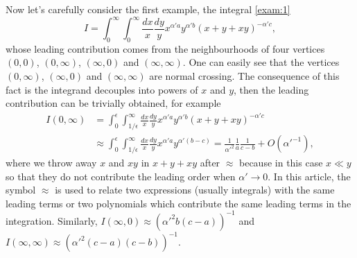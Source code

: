 \documentclass[12pt]{article}
\theoremstyle{definition}
\theoremstyle{plain}
\begin{document}

Now let's carefully consider the first example, the integral \eqref{exam:1}
\[
	I=\int_0^\infty \int_0^\infty\frac{dx}{x}\frac{dy}{y}x^{\alpha' a}y^{\alpha' b}(x+y+x y)^{-\alpha' c},
\]
whose leading contribution comes from the neighbourhoods of four vertices $(0,0)$, $(0,\infty)$, $(\infty,0)$ and $(\infty,\infty)$. One can easily see that the vertices $(0,\infty)$, $(\infty,0)$ and $(\infty,\infty)$ are normal crossing. The consequence of this fact is the integrand decouples into powers of $x$ and $y$, then the leading contribution can be trivially obtained, for example 
\begin{align*}
	I(0,\infty)&=\int_{0}^\epsilon\int_{1/\epsilon}^\infty \frac{dx}{x}\frac{dy}{y}x^{\alpha' a}y^{\alpha' b}(x+y+xy)^{-\alpha' c} \\
	&\approx \int_{0}^\epsilon\int_{1/\epsilon}^\infty \frac{dx}{x}\frac{dy}{y}x^{\alpha' a}y^{\alpha' (b-c)}= 
	\frac{1}{{\alpha'}^2}\frac{1}{a} \frac{1}{c-b}+O({\alpha'}^{-1}),
\end{align*}
where we throw away $x$ and $xy$ in $x+y+xy$ after $\approx$ because in this case $x\ll y$
so that they do not contribute the leading order when $\alpha' \to 0$.
In this article, the symbol $\approx$ is used to relate two expressions 
(usually integrals) with the same leading terms 
or two polynomials which contribute the same leading terms in the integration.
Similarly, $I(\infty,0)\approx ({\alpha'}^2 b (c-a))^{-1}$ and $I(\infty,\infty)\approx (\alpha'^{2}(c-a) (c-b))^{-1}.$
\end{document}
